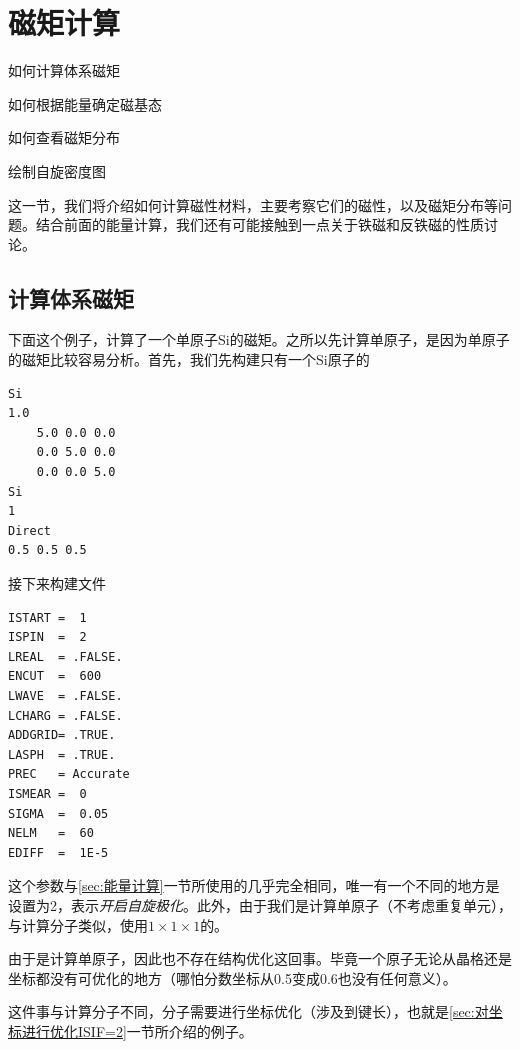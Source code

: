 \section{磁矩计算}\label{sec:磁矩计算}

\begin{Abstract}
    \item 如何计算体系磁矩
    \item 如何根据能量确定磁基态
    \item 如何查看磁矩分布
    \item 绘制自旋密度图
\end{Abstract}

这一节，我们将介绍如何计算磁性材料，主要考察它们的磁性，以及磁矩分布等问题。结合前面的能量计算，我们还有可能接触到一点关于铁磁和反铁磁的性质讨论。

\subsection{计算体系磁矩}\label{subsec:磁矩计算-计算体系磁矩ISPIN=2}

下面这个例子，计算了一个单原子Si的磁矩。之所以先计算单原子，是因为单原子的磁矩比较容易分析。首先，我们先构建只有一个Si原子的

\begin{lstlisting}[caption=POSCAR]
Si
1.0
    5.0 0.0 0.0
    0.0 5.0 0.0
    0.0 0.0 5.0
Si    
1
Direct
0.5 0.5 0.5
\end{lstlisting}

接下来构建文件

\begin{lstlisting}[caption=INCAR]
ISTART =  1
ISPIN  =  2
LREAL  = .FALSE.
ENCUT  =  600
LWAVE  = .FALSE.
LCHARG = .FALSE.
ADDGRID= .TRUE.
LASPH  = .TRUE.
PREC   = Accurate
ISMEAR =  0
SIGMA  =  0.05
NELM   =  60
EDIFF  =  1E-5
\end{lstlisting}

这个参数与\ref{sec:能量计算}一节所使用的几乎完全相同，唯一有一个不同的地方是设置为2，表示\emph{开启自旋极化}。此外，由于我们是计算单原子（不考虑重复单元），与计算分子类似，使用$1\times1\times1$的。

\begin{attention}
    由于是计算单原子，因此也不存在结构优化这回事。毕竟一个原子无论从晶格还是坐标都没有可优化的地方（哪怕分数坐标从0.5变成0.6也没有任何意义）。

    这件事与计算分子不同，分子需要进行坐标优化（涉及到键长），也就是\ref{sec:对坐标进行优化ISIF=2}一节所介绍的例子。
\end{attention}

